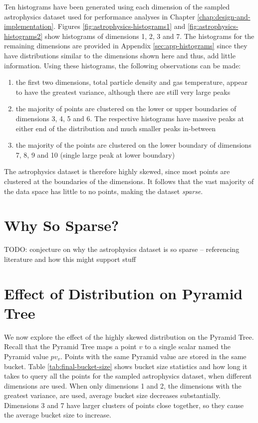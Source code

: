 Ten histograms have been generated using each dimension of the sampled astrophysics dataset used for performance analyses in Chapter \ref{chap:design-and-implementation}. Figures \ref{fig:astrophysics-histograms1} and \ref{fig:astrophysics-histograms2} show histograms of dimensions 1, 2, 3 and 7. The histograms for the remaining dimensions are provided in Appendix \ref{sec:app-histograms} since they have distributions similar to the dimensions shown here and thus, add little information. Using these histograms, the following observations can be made:
\begin{enumerate}
	\item the first two dimensions, total particle density and gas temperature, appear to have the greatest variance, although there are still very large peaks
	\item the majority of points are clustered on the lower or upper boundaries of dimensions 3, 4, 5 and 6. The respective histograms have massive peaks at either end of the distribution and much smaller peaks in-between
	\item the majority of the points are clustered on the lower boundary of dimensions 7, 8, 9 and 10 (single large peak at lower boundary)
\end{enumerate}
The astrophysics dataset is therefore highly skewed, since most points are clustered at the boundaries of the dimensions. It follows that the vast majority of the data space has little to no points, making the dataset \textit{sparse}.

\section{Why So Sparse?}

TODO: conjecture on why the astrophysics dataset is so sparse -- referencing literature and how this might support stuff

\section{Effect of Distribution on Pyramid Tree}

We now explore the effect of the highly skewed distribution on the Pyramid Tree. Recall that the Pyramid Tree maps a point $v$ to a single scalar named the Pyramid value $pv_v$. Points with the same Pyramid value are stored in the same bucket. Table \ref{tab:final-bucket-size} shows bucket size statistics and how long it takes to query all the points for the sampled astrophysics dataset, when different dimensions are used. When only dimensions 1 and 2, the dimensions with the greatest variance, are used, average bucket size decreases substantially. Dimensions 3 and 7 have larger clusters of points close together, so they cause the average bucket size to increase.

